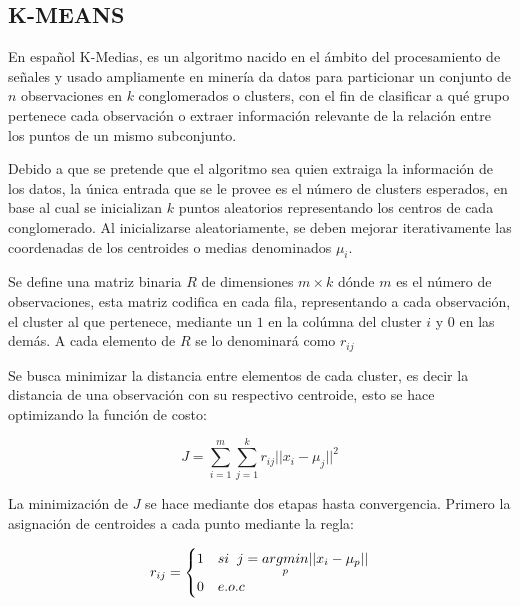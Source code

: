         \subsection{K-MEANS}
        	En español K-Medias, es un algoritmo nacido en el ámbito del procesamiento de señales y usado ampliamente en minería da datos para particionar un conjunto de $n$ observaciones en $k$ conglomerados o clusters, con el fin de clasificar a qué grupo pertenece cada observación o extraer información relevante de la relación entre los puntos de un mismo subconjunto.
        	
        	Debido a que se pretende que el algoritmo sea quien extraiga la información de los datos, la única entrada que se le provee es el número de clusters esperados, en base al cual se inicializan $k$ puntos aleatorios representando los centros de cada conglomerado. Al inicializarse aleatoriamente, se deben mejorar iterativamente las coordenadas de los centroides o medias denominados $\mu_i$.
        	
        	Se define una matriz binaria $R$ de dimensiones $m\times k$ dónde $m$ es el número de observaciones, esta matriz codifica en cada fila, representando a cada observación, el cluster al que pertenece, mediante un $1$ en la colúmna del cluster $i$ y $0$ en las demás. A cada elemento de $R$ se lo denominará como $r_{ij}$
        	
        	Se busca minimizar la distancia entre elementos de cada cluster, es decir la distancia de una observación con su respectivo centroide, esto se hace optimizando la función de costo:
        	
        	\begin{equation}
        		J = \sum_{i=1}^m\sum_{j=1}^k r_{ij}||x_i - \mu_j||^2
        	\end{equation}
        	
        	La minimización de $J$ se hace mediante dos etapas hasta convergencia. Primero la asignación de centroides a cada punto mediante la regla:
        	
        	\begin{equation}
        		r_{ij} = 
        		\begin{cases}
        			1 & si\hspace{2mm}j = \underset{p}{argmin}||x_i - \mu_p||\\
        			0 & e.o.c
        		\end{cases}
        	\end{equation}
        
